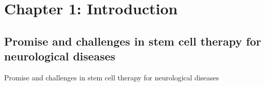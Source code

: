 \newpage
\section{Chapter 1: Introduction}

\subsection{Promise and challenges in stem cell  therapy for neurological diseases}

Promise and challenges in stem cell  therapy for neurological diseases